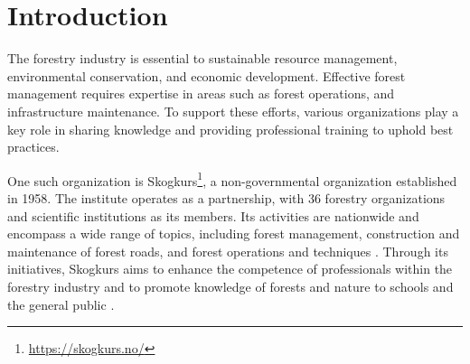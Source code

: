 \chapter{Introduction}

The forestry industry is essential to sustainable resource management, environmental conservation, and economic development. Effective forest management requires expertise in areas such as forest operations, and infrastructure maintenance. To support these efforts, various organizations play a key role in sharing knowledge and providing professional training to uphold best practices.

One such organization is Skogkurs\footnote{\url{https://skogkurs.no/}}, a non-governmental organization established in 1958. The institute operates as a partnership, with 36 forestry organizations and scientific institutions as its members. Its activities are nationwide and encompass a wide range of topics, including forest management, construction and maintenance of forest roads, and forest operations and techniques \cite{skogkurs_eng}. Through its initiatives, Skogkurs aims to enhance the competence of professionals within the forestry industry and to promote knowledge of forests and nature to schools and the general public \cite{skogkurs_nor}. 

